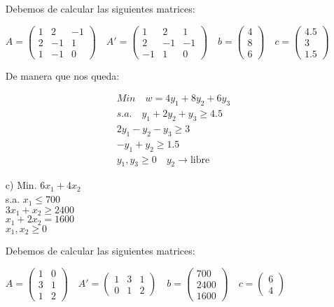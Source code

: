 \begin{itemize}
    Debemos de calcular las siguientes matrices:

    $ A =
    \begin{pmatrix}
        1 & 2 & -1 \\
        2 & -1 & 1 \\
        1 & -1 & 0
    \end{pmatrix} \quad
    A' = \begin{pmatrix}
        1 & 2 & 1 \\
        2 & -1 & -1 \\
        -1 & 1 & 0
    \end{pmatrix}
    \quad b = \begin{pmatrix}
        4 \\
        8 \\
        6
    \end{pmatrix} \quad c = \begin{pmatrix}
        4.5 \\
        3 \\
        1.5
    \end{pmatrix}
    $

    De manera que nos queda:

    \begin{align*}
        Min \quad w = 4y_1 + 8y_2 + 6y_3 \\
        s.a. \quad y_1 + 2y_2 + y_3 \geq 4.5 \\
        2y_1 - y_2 - y_3 \geq 3 \\
        - y_1 + y_2 \geq 1.5 \\
        y_1, y_3 \geq 0 \quad y_2 \rightarrow \text{libre}
    \end{align*}
    
    \item[c)] Min. \quad $6x_1 + 4x_2$ \\
    s.a. \quad $x_1 \leq 700$ \\
    \quad \quad $3x_1 + x_2 \geq 2400$ \\
    \quad \quad $x_1 + 2x_2 = 1600$ \\
    \quad \quad $x_1, x_2 \geq 0$

    Debemos de calcular las siguientes matrices:

    $ A =
    \begin{pmatrix}
        1 & 0 \\
        3 & 1 \\
        1 & 2
    \end{pmatrix} \quad
    A' = \begin{pmatrix}
        1 & 3 & 1 \\
        0 & 1 & 2
    \end{pmatrix}
    \quad b = \begin{pmatrix}
        700 \\
        2400 \\
        1600
    \end{pmatrix} \quad c = \begin{pmatrix}
        6 \\
        4
    \end{pmatrix}
    $


\end{itemize}
